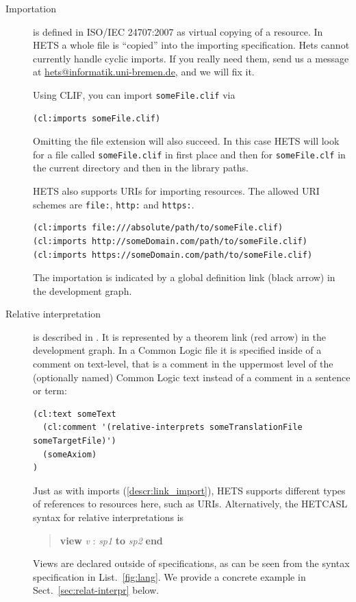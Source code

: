 \documentclass{article}
\newcommand{\normalTEXTSC}[2]{{#1\scriptsize#2}}
\newcommand     {\Hets}{\normalTEXTSC{H}{ETS}\xspace}
\newcommand{\HetCASL}{\normalTEXTSC{H}{ET}\normalTEXTSC{C}{ASL}\xspace}
\begin{document}
\begin{description}
\item[Importation] \label{descr:link_import}
  is defined in ISO/IEC 24707:2007 \cite{CommonLogic:oldfashioned} as virtual copying of a 
  resource. In \Hets a whole file is ``copied'' into the importing  
  specification. Hets cannot currently handle cyclic imports. If you really need
  them, send us a message at \href{mailto:hets@informatik.uni-bremen.de}{hets@informatik.uni-bremen.de}, and we will fix it.
  
  Using CLIF, you can import \texttt{someFile.clif} via
  \begin{lstlisting}[language=clif]
(cl:imports someFile.clif)
  \end{lstlisting}
  Omitting the file extension will also succeed. In this case \Hets will look 
  for a file called \texttt{someFile.clif} in first place and then for 
  \texttt{someFile.clf} in the current directory and then in the library paths.

  \Hets also supports URIs for importing resources. The allowed URI schemes are
  \texttt{file:}, \texttt{http:} and \texttt{https:}.
  \begin{lstlisting}[language=clif]
(cl:imports file:///absolute/path/to/someFile.clif)
(cl:imports http://someDomain.com/path/to/someFile.clif)
(cl:imports https://someDomain.com/path/to/someFile.clif)
  \end{lstlisting}

  The importation is indicated by a global definition link (black arrow) in the 
  development graph.

\item[Relative interpretation]
  is described in \cite{colore-fois}. It is represented by a theorem link 
  (red arrow) in the development graph. In a Common Logic file it is specified 
  inside of a comment on text-level, that is a comment in the uppermost level 
  of the (optionally named) Common Logic text instead of a comment in a sentence or 
  term:
  
  \begin{lstlisting}[language=clif]
(cl:text someText
  (cl:comment '(relative-interprets someTranslationFile someTargetFile)')
  (someAxiom)
)
  \end{lstlisting}
  Just as with imports (\ref{descr:link_import}), \Hets supports different types 
  of references to resources here, such as URIs.
  Alternatively, the \HetCASL syntax for relative interpretations is
\begin{quote}
\textbf{view} \textit{v} : \textit{sp1} \textbf{to} \textit{sp2} \textbf{end}
\end{quote}
  Views are declared outside of specifications, as can be seen from the syntax specification in List.~\ref{fig:lang}.  We provide a concrete example in Sect.~\ref{sec:relat-interpr} below.
  

\end{description}
\end{document}
